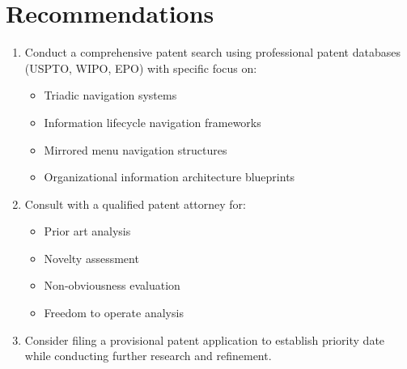 \documentclass[11pt,a4paper]{article}
\begin{document}
\section*{Recommendations}

\begin{enumerate}
  \item Conduct a comprehensive patent search using professional patent databases (USPTO, WIPO, EPO) with specific focus on:
  \begin{itemize}[noitemsep]
    \item Triadic navigation systems
    \item Information lifecycle navigation frameworks
    \item Mirrored menu navigation structures
    \item Organizational information architecture blueprints
  \end{itemize}
  
  \item Consult with a qualified patent attorney for:
  \begin{itemize}[noitemsep]
    \item Prior art analysis
    \item Novelty assessment
    \item Non-obviousness evaluation
    \item Freedom to operate analysis
  \end{itemize}
  
  \item Consider filing a provisional patent application to establish priority date while conducting further research and refinement.
\end{enumerate}
\end{document}

